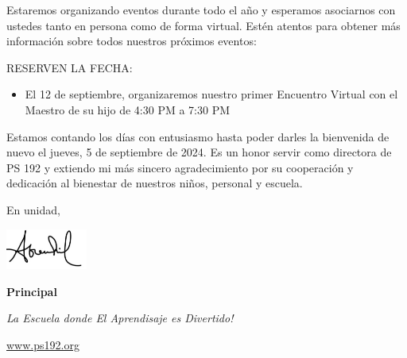 \documentclass[12pt,letterpaper]{article}
\begin{document}
Estaremos organizando eventos durante todo el año y esperamos asociarnos con ustedes tanto en persona como de forma virtual. Estén atentos para obtener más información sobre todos
nuestros próximos eventos:
\pagebreak
\vspace*{2cm}

RESERVEN LA FECHA:
	\begin{itemize}
	\item El 12 de septiembre, organizaremos nuestro primer Encuentro Virtual con el
	Maestro de su hijo de 4:30 PM a 7:30 PM 
	\end{itemize}
 
Estamos contando los días con entusiasmo hasta poder darles la bienvenida de nuevo el 
jueves, 5 de septiembre de 2024. Es un honor servir como directora de PS 192 y extiendo mi más
sincero agradecimiento por su cooperación y dedicación al bienestar de nuestros niños,
personal y escuela.

En unidad,

\includegraphics[width=0.2\textwidth]{hil_signature}

\textbf{Principal}

\textit{La Escuela donde El Aprendisaje es Divertido!}

\url{www.ps192.org}
\end{document}
